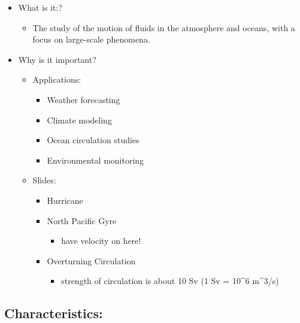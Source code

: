 \begin{itemize}
\tightlist
\item
  What is it:?

  \begin{itemize}
  \tightlist
  \item
    The study of the motion of fluids in the atmosphere and oceans, with
    a focus on large-scale phenomena.
  \end{itemize}
\item
  Why is it important?

  \begin{itemize}
  \tightlist
  \item
    Applications:
    \begin{itemize}
    \tightlist
    \item
      Weather forecasting
    \item
      Climate modeling
    \item
      Ocean circulation studies
    \item
      Environmental monitoring
    \end{itemize}
  \item
    Slides:

    \begin{itemize}
    \tightlist
    \item
      Hurricane
    \item
      North Pacific Gyre

      \begin{itemize}
      \tightlist
      \item
        have velocity on here!
      \end{itemize}
    \item
      Overturning Circulation

      \begin{itemize}
      \tightlist
      \item
        strength of circulation is about 10 Sv (1 Sv = 10\^{}6 m\^{}3/s)
      \end{itemize}
    \end{itemize}
  \end{itemize}
\end{itemize}

\subsection{Characteristics:}\label{characteristics}

